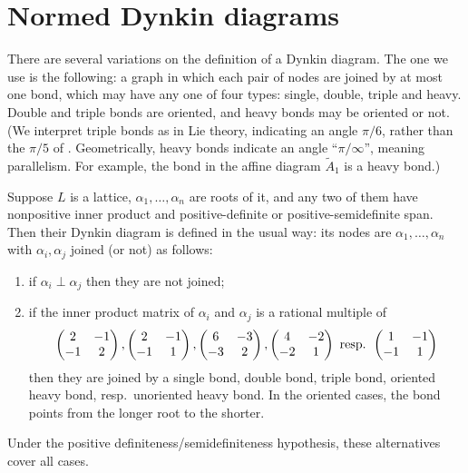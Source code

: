 \documentclass[12pt]{amsart}
\def\Atilde{\widetilde{A}}
\numberwithin{theorem}{section}
\numberwithin{equation}{section}
\numberwithin{figure}{section}
\theoremstyle{remark}
\begin{document}
\section{Normed Dynkin diagrams}
\label{SecNormedDynkinDiagrams}

\noindent
There are several 
variations on the definition of a Dynkin diagram. The one
we use is the following:
a graph in which each pair
of nodes are joined by at most one bond, which may have any one of four types:
single, double, triple and heavy.  Double and triple bonds
are oriented, and heavy bonds may be oriented or not.  
(We interpret triple bonds as in Lie theory, indicating an angle $\pi/6$,
rather than the $\pi/5$ of \cite{VinbergOnTheGroups}.
Geometrically, heavy bonds indicate an angle ``$\pi/\infty$'', meaning parallelism.
For example, the bond in the affine diagram 
$\Atilde_1$ is a heavy bond.)

Suppose $L$ is a lattice, $\alpha_1,\dots,\alpha_n$ are roots of it, and any
two of them have nonpositive inner product and  positive-definite 
or positive-semidefinite span.  Then their Dynkin diagram 
is defined in the usual way: its nodes are $\alpha_1,\dots,\alpha_n$ with
$\alpha_i,\alpha_j$ joined (or not) as follows:
\begin{enumerate}
    \item
        if $\alpha_i\perp \alpha_j$ then they are not joined;
    \item
        if the inner product matrix of $\alpha_i$ and $\alpha_j$ is a rational
        multiple of 
        $$
        \begin{pmatrix} 2&-1\\ -1&2
        \end{pmatrix},
        \begin{pmatrix}2&-1\\-1&1 
        \end{pmatrix},
        \begin{pmatrix}6&-3\\-3&2 
        \end{pmatrix},
        \begin{pmatrix}4&-2\\-2&1 
        \end{pmatrix}\hbox{ resp. }
        \begin{pmatrix}1&-1\\-1&1 
        \end{pmatrix}
        $$
        then they are joined by a single bond, double bond, triple bond,
        oriented heavy bond, resp.\ unoriented heavy bond. In the
        oriented cases, the bond  points from the longer root to the
        shorter.
\end{enumerate}
Under the positive definiteness/semidefiniteness hypothesis,
these alternatives cover all cases.
\end{document}
